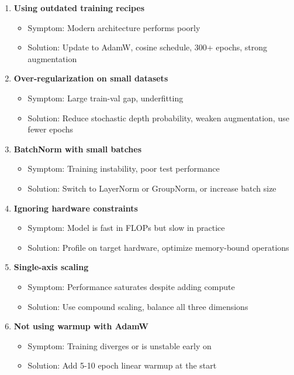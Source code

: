 \documentclass{article}
\begin{document}
\begin{enumerate}
    \item \textbf{Using outdated training recipes}
    \begin{itemize}
        \item Symptom: Modern architecture performs poorly
        \item Solution: Update to AdamW, cosine schedule, 300+ epochs, strong augmentation
    \end{itemize}
    
    \item \textbf{Over-regularization on small datasets}
    \begin{itemize}
        \item Symptom: Large train-val gap, underfitting
        \item Solution: Reduce stochastic depth probability, weaken augmentation, use fewer epochs
    \end{itemize}
    
    \item \textbf{BatchNorm with small batches}
    \begin{itemize}
        \item Symptom: Training instability, poor test performance
        \item Solution: Switch to LayerNorm or GroupNorm, or increase batch size
    \end{itemize}
    
    \item \textbf{Ignoring hardware constraints}
    \begin{itemize}
        \item Symptom: Model is fast in FLOPs but slow in practice
        \item Solution: Profile on target hardware, optimize memory-bound operations
    \end{itemize}
    
    \item \textbf{Single-axis scaling}
    \begin{itemize}
        \item Symptom: Performance saturates despite adding compute
        \item Solution: Use compound scaling, balance all three dimensions
    \end{itemize}
    
    \item \textbf{Not using warmup with AdamW}
    \begin{itemize}
        \item Symptom: Training diverges or is unstable early on
        \item Solution: Add 5-10 epoch linear warmup at the start
    \end{itemize}
\end{enumerate}
\end{document}
